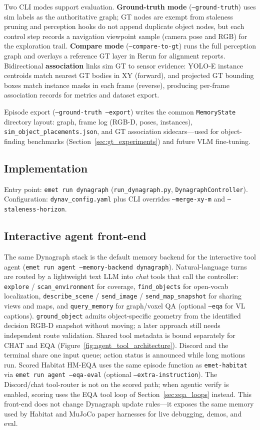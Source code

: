 Two CLI modes support evaluation.
\textbf{Ground-truth mode} (\texttt{--ground-truth}) uses sim labels as the authoritative graph; GT nodes are exempt from staleness pruning and perception hooks do not append duplicate object nodes, but each control step records a navigation viewpoint sample (camera pose and RGB) for the exploration trail.
\textbf{Compare mode} (\texttt{--compare-to-gt}) runs the full perception graph and overlays a reference GT layer in Rerun for alignment reports.
Bidirectional \textbf{association} links sim GT to sensor evidence: YOLO-E instance centroids match nearest GT bodies in XY (forward), and projected GT bounding boxes match instance masks in each frame (reverse), producing per-frame association records for metrics and dataset export.

Episode export (\texttt{--ground-truth --export}) writes the common \texttt{MemoryState} directory layout: graph, frame log (RGB-D, poses, instances), \texttt{sim\_object\_placements.json}, and GT association sidecars---used for object-finding benchmarks (Section~\ref{sec:gt_experiments}) and future VLM fine-tuning.

\subsection{Implementation}

Entry point: \texttt{emet run dynagraph} (\texttt{run\_dynagraph.py}, \texttt{DynagraphController}).
Configuration: \texttt{dynav\_config.yaml} plus CLI overrides \texttt{--merge-xy-m} and \texttt{--staleness-horizon}.

\subsection{Interactive agent front-end}
\label{sec:interactive_agent}

The same Dynagraph stack is the default memory backend for the interactive tool agent (\texttt{emet run agent --memory-backend dynagraph}).
Natural-language turns are routed by a lightweight text LLM into \emph{chat} tools that call the controller: \texttt{explore} / \texttt{scan\_environment} for coverage, \texttt{find\_objects} for open-vocab localization, \texttt{describe\_scene} / \texttt{send\_image} / \texttt{send\_map\_snapshot} for sharing views and maps, and \texttt{query\_memory} for graph/voxel QA (optional \texttt{--eqa} for VL captions).
\texttt{ground\_object} admits object-specific geometry from the identified
decision RGB-D snapshot without moving; a later approach still needs independent
route validation. Shared tool metadata is bound separately for CHAT and EQA
(Figure~\ref{fig:agent_tool_architecture}).
Discord and the terminal share one input queue; action status is announced while long motions run.
Scored Habitat HM-EQA uses the same episode function as \texttt{emet-habitat} via \texttt{emet run agent --eqa-eval} (optional \texttt{--extra-instruction}).
The Discord/chat tool-router is not on the scored path; when agentic verify is enabled, scoring uses the EQA tool loop of Section~\ref{sec:eqa_loops} instead.
This front-end does not change Dynagraph update rules---it exposes the same memory used by Habitat and MuJoCo paper harnesses for live debugging, demos, and eval.

